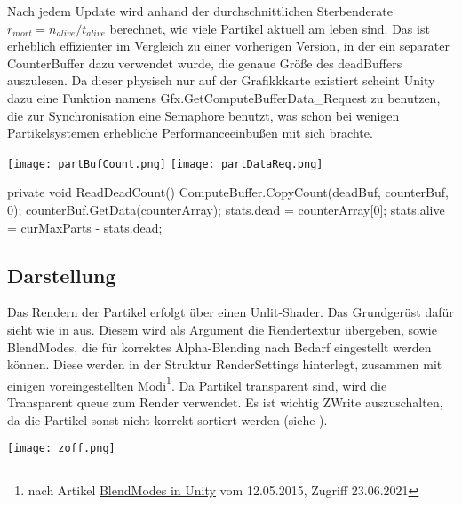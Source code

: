 Nach jedem Update wird anhand der durchschnittlichen Sterbenderate $r_{mort} = n_{alive} / t_{alive}$ berechnet, wie viele Partikel aktuell am leben sind. Das ist erheblich effizienter im Vergleich zu einer vorherigen Version, in der ein separater CounterBuffer dazu verwendet wurde, die genaue Grö{\ss}e des deadBuffers auszulesen. Da dieser physisch nur auf der Grafikkkarte existiert scheint Unity dazu eine Funktion namens Gfx.GetComputeBufferData\_Request zu benutzen, die zur Synchronisation eine Semaphore benutzt, was schon bei wenigen Partikelsystemen erhebliche Performanceeinbu{\ss}en mit sich brachte.

\begin{minipage}{0.95\linewidth}
\vspace{5mm}
\captionsetup{type=figure}
\texttt{[image: partBufCount.png]}
\texttt{[image: partDataReq.png]}
\end{minipage}

\begin{csh}[caption=Controller DeadCount]
private void ReadDeadCount()
{
    ComputeBuffer.CopyCount(deadBuf, counterBuf, 0);
    counterBuf.GetData(counterArray);
    stats.dead = counterArray[0];
    stats.alive = curMaxParts - stats.dead;
}
\end{csh}

\subsection{Darstellung}

Das Rendern der Partikel erfolgt über einen Unlit-Shader. Das Grundgerüst dafür sieht wie in  aus. Diesem wird als Argument die Rendertextur übergeben, sowie BlendModes, die für korrektes Alpha-Blending nach Bedarf eingestellt werden können. Diese werden in der Struktur RenderSettings hinterlegt, zusammen mit einigen voreingestellten Modi\footnote{nach Artikel \href{https://elringus.me/blend-modes-in-unity}{BlendModes in Unity} vom 12.05.2015, Zugriff 23.06.2021}. Da Partikel transparent sind, wird die Transparent queue zum Render verwendet. Es ist wichtig ZWrite auszuschalten, da die Partikel sonst nicht korrekt sortiert werden (siehe ).

\begin{minipage}{\linewidth}
\begin{center}
\vspace{5mm}
\captionsetup{type=figure}
\texttt{[image: zoff.png]}
\label{img:zoff}
\end{center}
\end{minipage}

